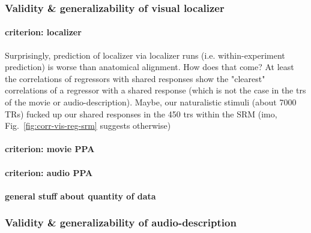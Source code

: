 \subsubsection{Validity \& generalizability of visual localizer}



\paragraph{criterion: localizer}

%
Surprisingly, prediction of localizer via localizer runs (i.e. within-experiment
prediction) is worse than anatomical alignment.
%
How does that come? At least the correlations of regressors with shared
responses show the "clearest" correlations of a regressor with a shared response
(which is not the case in the \acp{tr} of the movie or audio-description).
%
Maybe, our naturalistic stimuli (about 7000 TRs) fucked up our shared responses
in the 450 \acp{tr} within the SRM (imo, Fig.~\ref{fig:corr-vis-reg-srm}
suggests otherwise)


\paragraph{criterion: movie PPA}

\paragraph{criterion: audio PPA}

\paragraph{general stuff about quantity of data}




\subsubsection{Validity \& generalizability of audio-description}



